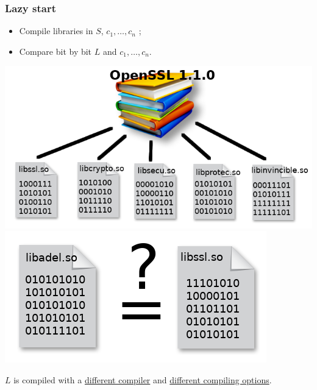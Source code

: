 \documentclass[11pt]{beamer}
\begin{document}
\begin{frame}
    \frametitle{Lazy start}

    
    \begin{block}{}
        \begin{itemize}
            \item Compile libraries in $S$, $c_1, \dots, c_n$ ; 
            \item Compare bit by bit $L$ and $c_1, \dots, c_n$.
        \end{itemize}
    \end{block}
    \begin{center}
    \includegraphics[scale=0.2]{compillib.png}
        \hspace{5em}
    \includegraphics[scale=0.2]{compbin.png}
    \end{center}
    \begin{block}{}
        $L$ is compiled with a \underline{different compiler} and \underline{different
        compiling options}.
    \end{block}

\end{frame}
\end{document}
